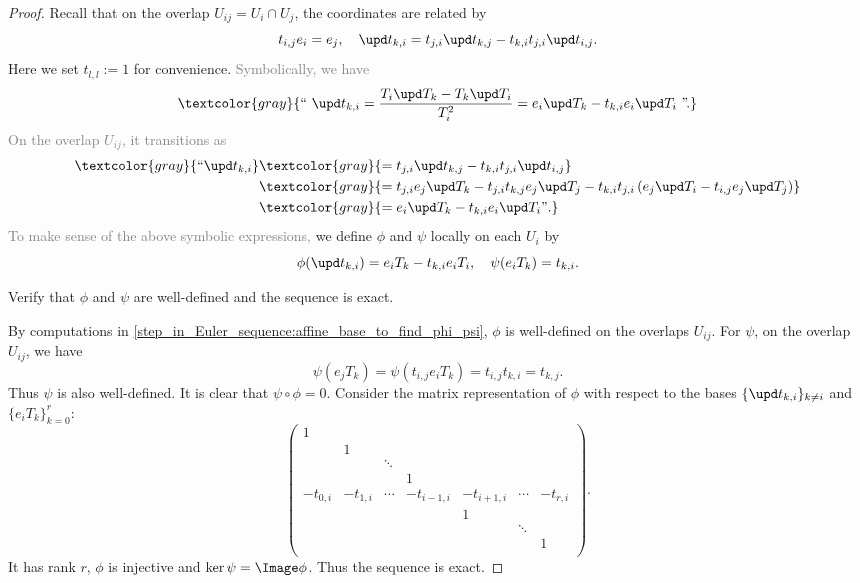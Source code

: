 \begin{proof}
        Recall that on the overlap \(U_{ij} = U_i \cap U_j\), the coordinates are related by
        \[ t_{i,j} e_i = e_j, \quad \upd t_{k,i} = t_{j,i} \upd t_{k,j} - t_{k,i} t_{j,i} \upd t_{i,j}. \]
        Here we set \(t_{l,l} := 1\) for convenience.
        \textcolor{gray}{Symbolically, we have }
        \[ \textcolor{gray}{\text{`` }\upd t_{k,i} = \frac{T_i \upd T_k - T_k \upd T_i}{T_i^2} = e_i \upd T_k - t_{k,i} e_i \upd T_i \text{ ''.}} \]
        \textcolor{gray}{On the overlap \(U_{ij}\), it transitions as}
        \begin{align*}
            \textcolor{gray}{\text{``}\upd t_{k,i}}  &\textcolor{gray}{= t_{j,i} \upd t_{k,j} - t_{k,i} t_{j,i} \upd t_{i,j}} \\
                                            &\textcolor{gray}{= t_{j,i} e_j \upd T_k - t_{j,i} t_{k,j} e_j \upd T_j - t_{k,i} t_{j,i} \left( e_j \upd T_i - t_{i,j} e_j \upd T_j \right)} \\
                                            &\textcolor{gray}{= e_i \upd T_k - t_{k,i} e_i \upd T_i \text{''}.}
        \end{align*}
        \textcolor{gray}{To make sense of the above symbolic expressions,} we define \(\phi\) and \(\psi\) locally on each \(U_i\) by
        \[
            \phi(\upd t_{k,i}) = e_i T_k - t_{k,i} e_i T_i, \quad \psi(e_i T_k) = t_{k,i}.
        \]

        \begin{step}\label{step_in_Euler_sequence:verify_phi_psi_well_defined_and_exactness}
            Verify that \(\phi\) and \(\psi\) are well-defined and the sequence is exact.
        \end{step}
        By computations in \cref{step_in_Euler_sequence:affine_base_to_find_phi_psi}, \(\phi\) is well-defined on the overlaps \(U_{ij}\).
        For \(\psi\), on the overlap \(U_{ij}\), we have
        \[
            \psi(e_j T_k) = \psi(t_{i,j} e_i T_k) = t_{i,j} t_{k,i} = t_{k,j}.
        \]
        Thus \(\psi\) is also well-defined.
        It is clear that \(\psi \circ \phi = 0\).
        Consider the matrix representation of \(\phi\) with respect to the bases \(\{\upd t_{k,i}\}_{k \neq i}\) and \(\{e_i T_k\}_{k=0}^r\):
        \[ \begin{pmatrix}
            1 & & & & & & \\
            & 1 & & & & & \\
            & & \ddots & & & &  \\
            & & & 1 & & & \\
            -t_{0,i} & -t_{1,i} & \cdots & -t_{i-1,i} & -t_{i+1,i} & \cdots & -t_{r,i} \\
            & & & & 1 & & \\
            & & & & &\ddots & \\
            & & & & & & 1 \\
        \end{pmatrix}. \]
        It has rank \(r\), \(\phi\) is injective and \(\ker \psi = \Image \phi\).
        Thus the sequence is exact.


\end{proof}
